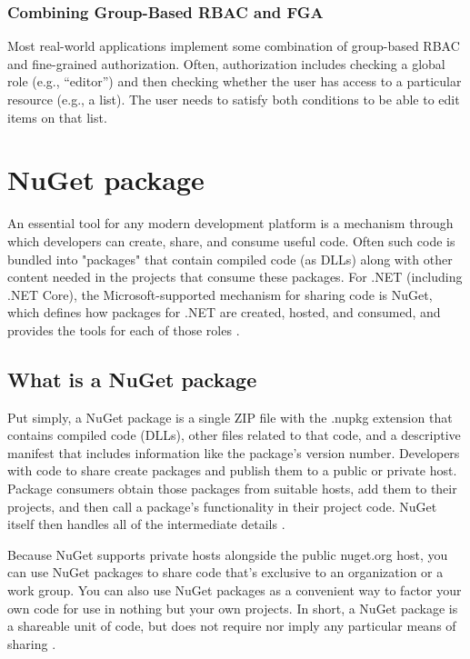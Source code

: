 \subsubsection{Combining Group-Based RBAC and FGA}

Most real-world applications implement some combination of group-based RBAC and fine-grained authorization. Often, authorization includes checking a global role (e.g., “editor”) and then checking whether the user has access to a particular resource (e.g., a list). The user needs to satisfy both conditions to be able to edit items on that list.

\section{NuGet package}

An essential tool for any modern development platform is a mechanism through which developers can create, share, and consume useful code. Often such code is bundled into "packages" that contain compiled code (as DLLs) along with other content needed in the projects that consume these packages. For .NET (including .NET Core), the Microsoft-supported mechanism for sharing code is NuGet, which defines how packages for .NET are created, hosted, and consumed, and provides the tools for each of those roles \autocite{Microsoft2022}.

\subsection{What is a NuGet package}

Put simply, a NuGet package is a single ZIP file with the .nupkg extension that contains compiled code (DLLs), other files related to that code, and a descriptive manifest that includes information like the package's version number. Developers with code to share create packages and publish them to a public or private host. Package consumers obtain those packages from suitable hosts, add them to their projects, and then call a package's functionality in their project code. NuGet itself then handles all of the intermediate details \autocite{Microsoft2022}.

Because NuGet supports private hosts alongside the public nuget.org host, you can use NuGet packages to share code that's exclusive to an organization or a work group. You can also use NuGet packages as a convenient way to factor your own code for use in nothing but your own projects. In short, a NuGet package is a shareable unit of code, but does not require nor imply any particular means of sharing \autocite{Microsoft2022}.

